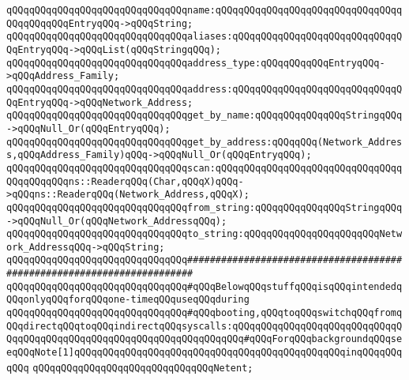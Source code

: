 \newline
\verb|qQQqqQQqqQQqqQQqqQQqqQQqqQQqqQQqname:qQQqqQQqqQQqqQQqqQQqqQQqqQQqqQQqqQQqqQQqqQQqEntryqQQq->qQQqString;|\newline
\verb|qQQqqQQqqQQqqQQqqQQqqQQqqQQqqQQqaliases:qQQqqQQqqQQqqQQqqQQqqQQqqQQqqQQqEntryqQQq->qQQqList(qQQqStringqQQq);|\newline
\verb|qQQqqQQqqQQqqQQqqQQqqQQqqQQqqQQqaddress_type:qQQqqQQqqQQqEntryqQQq->qQQqAddress_Family;|\newline
\verb|qQQqqQQqqQQqqQQqqQQqqQQqqQQqqQQqaddress:qQQqqQQqqQQqqQQqqQQqqQQqqQQqqQQqEntryqQQq->qQQqNetwork_Address;|\newline
\newline
\verb|qQQqqQQqqQQqqQQqqQQqqQQqqQQqqQQqget_by_name:qQQqqQQqqQQqqQQqStringqQQq->qQQqNull_Or(qQQqEntryqQQq);|\newline
\verb|qQQqqQQqqQQqqQQqqQQqqQQqqQQqqQQqget_by_address:qQQqqQQq(Network_Address,qQQqAddress_Family)qQQq->qQQqNull_Or(qQQqEntryqQQq);|\newline
\newline
\verb|qQQqqQQqqQQqqQQqqQQqqQQqqQQqqQQqscan:qQQqqQQqqQQqqQQqqQQqqQQqqQQqqQQqqQQqqQQqqQQqns::ReaderqQQq(Char,qQQqX)qQQq->qQQqns::ReaderqQQq(Network_Address,qQQqX);|\newline
\verb|qQQqqQQqqQQqqQQqqQQqqQQqqQQqqQQqfrom_string:qQQqqQQqqQQqqQQqStringqQQq->qQQqNull_Or(qQQqNetwork_AddressqQQq);|\newline
\verb|qQQqqQQqqQQqqQQqqQQqqQQqqQQqqQQqto_string:qQQqqQQqqQQqqQQqqQQqqQQqNetwork_AddressqQQq->qQQqString;|\newline
\newline
\verb|qQQqqQQqqQQqqQQqqQQqqQQqqQQqqQQq#######################################################################|\newline
\verb|qQQqqQQqqQQqqQQqqQQqqQQqqQQqqQQq#qQQqBelowqQQqstuffqQQqisqQQqintendedqQQqonlyqQQqforqQQqone-timeqQQquseqQQqduring|\newline
\verb|qQQqqQQqqQQqqQQqqQQqqQQqqQQqqQQq#qQQqbooting,qQQqtoqQQqswitchqQQqfromqQQqdirectqQQqtoqQQqindirectqQQqsyscalls:qQQqqQQqqQQqqQQqqQQqqQQqqQQqqQQqqQQqqQQqqQQqqQQqqQQqqQQqqQQqqQQqqQQqqQQq#qQQqForqQQqbackgroundqQQqseeqQQqNote[1]qQQqqQQqqQQqqQQqqQQqqQQqqQQqqQQqqQQqqQQqqQQqqQQqinqQQqqQQqqQQq|\newline
\newline
\verb|qQQqqQQqqQQqqQQqqQQqqQQqqQQqqQQqNetent;|\newline
